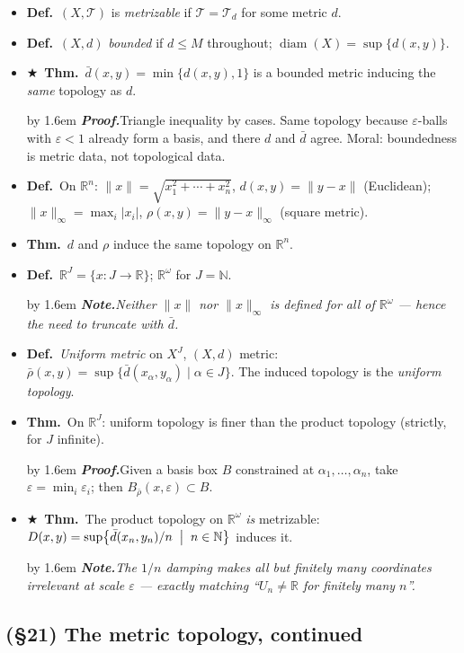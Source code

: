 \documentclass[12pt,a4paper]{article}
\newcommand{\Dfn}{\textbf{Def.}~}
\newcommand{\Thm}{\textbf{Thm.}~}
\newcommand{\Key}{$\bigstar$~}                  %
\newcommand{\Pf}[1]{%
  \par\addvspace{7pt}\nopagebreak
  \begingroup
    \advance\leftskip by 1.6em
    \parindent=0pt \small\color{prf}%
    \textbf{\textit{Proof.}}\enspace #1\par
  \endgroup
  \addvspace{9pt}}
\newcommand{\Cue}[1]{%
  \par\addvspace{7pt}\nopagebreak
  \begingroup
    \advance\leftskip by 1.6em
    \parindent=0pt \small\color{cue}%
    \textbf{\textit{Note.}}\enspace \textit{#1}\par
  \endgroup
  \addvspace{9pt}}
\newenvironment{BL}%
  {\begin{itemize}[leftmargin=1.4em,labelsep=0.55em,itemsep=11pt,topsep=11pt,parsep=0pt]}%
  {\end{itemize}}
\newcommand{\RR}{\mathbb{R}}
\newcommand{\NN}{\mathbb{N}}
\newcommand{\cT}{\mathcal{T}}
\DeclareMathOperator{\diam}{diam}
\begin{document}
\begin{BL}
\item \Dfn $(X,\cT)$ is \emph{metrizable} if $\cT=\cT_d$ for some metric $d$.
\item \Dfn $(X,d)$ \emph{bounded} if $d\le M$ throughout;
      $\diam(X)=\sup\{d(x,y)\}$.
\item \Key\Thm $\bar d(x,y)=\min\{d(x,y),1\}$ is a bounded metric inducing the \emph{same}
      topology as $d$.
\Pf{Triangle inequality by cases. Same topology because $\varepsilon$-balls with $\varepsilon<1$
already form a basis, and there $d$ and $\bar d$ agree. Moral: boundedness is metric data,
not topological data.}
\item \Dfn On $\RR^n$: \;$\|x\|=\sqrt{x_1^2+\cdots+x_n^2}$, $d(x,y)=\|y-x\|$ (Euclidean);
      $\|x\|_\infty=\max_i|x_i|$, $\rho(x,y)=\|y-x\|_\infty$ (square metric).
\item \Thm $d$ and $\rho$ induce the same topology on $\RR^n$.
\item \Dfn $\RR^J=\{x\colon J\to\RR\}$;\; $\RR^\omega$ for $J=\NN$.
\Cue{Neither $\|x\|$ nor $\|x\|_\infty$ is defined for all of $\RR^\omega$ --- hence the need to
truncate with $\bar d$.}
\item \Dfn \emph{Uniform metric} on $X^J$, $(X,d)$ metric:
      \(\bar\rho(x,y)=\sup\{\bar d(x_\alpha,y_\alpha)\mid\alpha\in J\}.\)
      The induced topology is the \emph{uniform topology}.
\item \Thm On $\RR^J$: uniform topology is finer than the product topology
      (strictly, for $J$ infinite).
\Pf{Given a basis box $B$ constrained at $\alpha_1,\dots,\alpha_n$, take
$\varepsilon=\min_i\varepsilon_i$; then $B_{\bar\rho}(x,\varepsilon)\subset B$.}
\item \Key\Thm The product topology on $\RR^\omega$ \emph{is} metrizable:
      \(D(x,y)=\sup\bigl\{\bar d(x_n,y_n)/n \;\bigm|\; n\in\NN\bigr\}\)
      induces it.
\Cue{The $1/n$ damping makes all but finitely many coordinates irrelevant at scale
$\varepsilon$ --- exactly matching ``$U_n\neq\RR$ for finitely many $n$''.}
\end{BL}

\subsection{(\S21) The metric topology, continued}
\end{document}
